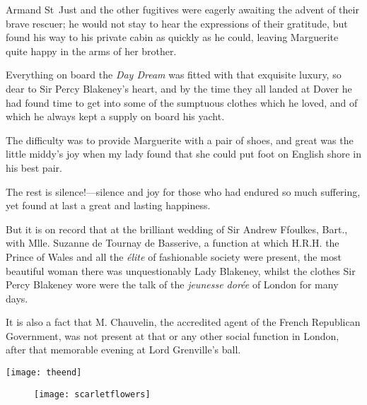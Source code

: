 Armand St~Just and the other fugitives were eagerly awaiting the advent of their brave rescuer; he would not stay to hear the expressions of their gratitude, but found his way to his private cabin as quickly as he could, leaving Marguerite quite happy in the arms of her brother.

Everything on board the \textit{Day Dream} was fitted with that exquisite luxury, so dear to Sir Percy Blakeney's heart, and by the time they all landed at Dover he had found time to get into some of the sumptuous clothes which he loved, and of which he always kept a supply on board his yacht.

The difficulty was to provide Marguerite with a pair of shoes, and great was the little middy's joy when my lady found that she could put foot on English shore in his best pair.

The rest is silence!\allowbreak---\allowbreak silence and joy for those who had endured so much suffering, yet found at last a great and lasting happiness.

But it is on record that at the brilliant wedding of Sir Andrew Ffoulkes, Bart., with Mlle. Suzanne de Tournay de Basserive, a function at which H.R.H. the Prince of Wales and all the \textit{élite} of fashionable society were present, the most beautiful woman there was unquestionably Lady Blakeney, whilst the clothes Sir Percy Blakeney wore were the talk of the \textit{jeunesse dorée} of London for many days.

It is also a fact that M. Chauvelin, the accredited agent of the French Republican Government, was not present at that or any other social function in London, after that memorable evening at Lord Grenville's ball.

\centering
\texttt{[image: theend]}
\clearpage
\vfill
\begin{figure}[p!]
\centering
\texttt{[image: scarletflowers]}
\label{flowers}
\end{figure}
\vfill
\thispagestyle{empty}
\clearpage